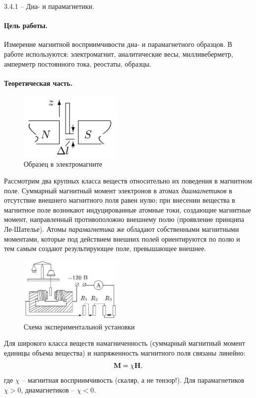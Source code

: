 \documentclass{lab_class}
\begin{document}
{\Large 3.4.1 -- Диа- и парамагнетики.}

\paragraph{Цель работы.}
Измерение магнитной восприимчивости диа- и парамагнетного образцов.
В работе используются: электромагнит, аналитические весы, милливеберметр, амперметр постоянного тока, реостаты, образцы.

\paragraph{Теоретическая часть.}

\begin{figure}
\centering
\includegraphics[width=5cm]{electromagnet.png}
\caption{Образец в электромагните}
\end{figure}

Рассмотрим два крупных класса веществ относительно их поведения в магнитном поле. Суммарный магнитный момент электронов в атомах \emph{диамагнетиков} в отсутствие внешнего магнитного поля равен нулю; при внесении вещества в магнитное поле возникают индуцированные атомные токи, создающие магнитные момент, направленный противоположно внешнему полю (проявление принципа Ле-Шателье). Атомы \emph{парамагнетика} же обладают собственными магнитными моментами, которые под действием внешних полей ориентируются по полю и тем самым создают результирующее поле, превышающее внешнее.

\begin{figure}
\centering
\includegraphics[width=5cm]{lab_scheme.png}
\caption{Схема экспериментальной установки}
\end{figure}

Для широкого класса веществ намагниченность (суммарный магнитный момент единицы объема вещества) и напряженность магнитного поля связаны линейно:
\begin{equation}
	\vb{M} = \chi \vb{H},
\end{equation}
где $\chi$ -- магнитная восприимчивость (скаляр, а не тензор!). Для парамагнетиков $\chi > 0$, диамагнетиков -- $\chi < 0$.
\end{document}
